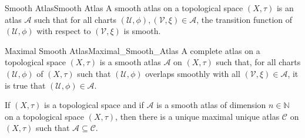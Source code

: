 \documentclass[oneside]{book}                                                  %
\begin{document}
            \begin{fdefinition}{Smooth Atlas}{Smooth Atlas}
                A smooth atlas on a topological space $(X,\tau)$ is an
                atlas $\mathcal{A}$ such that for all charts
                $(\mathcal{U},\phi),(\mathcal{V},\xi)\in\mathcal{A}$, the
                transition function of $(\mathcal{U},\phi)$ with respect to
                $(\mathcal{V},\xi)$ is smooth.
            \end{fdefinition}
            \begin{fdefinition}{Maximal Smooth Atlas}{Maximal_Smooth_Atlas}
                A complete atlas on a topological space $(X,\tau)$ is a smooth
                atlas $\mathcal{A}$ on $(X,\tau)$ such that, for all charts
                $(\mathcal{U},\phi)$ of $(X,\tau)$ such that $(\mathcal{U},\phi)$
                overlaps smoothly with all $(\mathcal{V},\xi)\in\mathcal{A}$, it
                is true that $(\mathcal{U},\phi)\in\mathcal{A}$.
            \end{fdefinition}
            \begin{theorem}
                If $(X,\tau)$ is a topological space and if $\mathcal{A}$ is a
                smooth atlas of dimension $n\in\mathbb{N}$ on a topological space
                $(X,\tau)$, then there is a unique maximal unique atlas
                $\mathcal{C}$ on $(X,\tau)$ such that
                $\mathcal{A}\subseteq\mathcal{C}$.
            \end{theorem}
\end{document}
